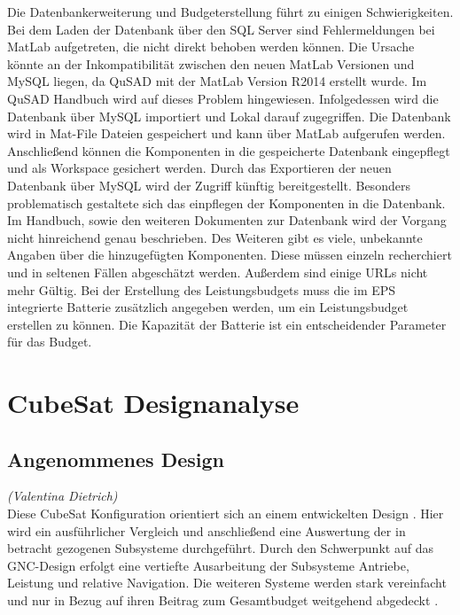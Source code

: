 			Die Datenbankerweiterung und Budgeterstellung führt zu einigen Schwierigkeiten. Bei dem Laden der Datenbank über den SQL Server sind Fehlermeldungen bei MatLab aufgetreten, die nicht direkt behoben werden können. Die Ursache könnte an der Inkompatibilität zwischen den neuen MatLab Versionen und MySQL liegen, da QuSAD mit der MatLab Version R2014 erstellt wurde. Im QuSAD Handbuch wird auf dieses Problem hingewiesen. Infolgedessen wird die Datenbank über MySQL importiert und Lokal darauf zugegriffen. Die Datenbank wird in Mat-File Dateien gespeichert und kann über MatLab aufgerufen werden. Anschließend können die Komponenten in die gespeicherte Datenbank eingepflegt und als Workspace gesichert werden. Durch das Exportieren der neuen Datenbank über MySQL wird der Zugriff künftig bereitgestellt. Besonders problematisch gestaltete sich das einpflegen der Komponenten in die Datenbank. Im Handbuch, sowie den weiteren Dokumenten zur Datenbank wird der Vorgang nicht hinreichend genau beschrieben. Des Weiteren gibt es viele, unbekannte Angaben über die hinzugefügten Komponenten. Diese müssen einzeln recherchiert und in seltenen Fällen abgeschätzt werden. Außerdem sind einige URLs nicht mehr Gültig. Bei der Erstellung des Leistungsbudgets muss die im EPS integrierte Batterie zusätzlich angegeben werden, um ein Leistungsbudget erstellen zu können. Die Kapazität der Batterie ist ein entscheidender Parameter für das Budget. 
		
		\section{CubeSat Designanalyse}
				
				\subsection{Angenommenes Design}
				\label{cap:AngenommenesDesign}
				\hfill\emph{(Valentina Dietrich)}\\
				
				Diese CubeSat Konfiguration orientiert sich an einem entwickelten Design \cite{Lettau.}. Hier wird ein ausführlicher Vergleich und anschließend eine Auswertung der in betracht gezogenen Subsysteme durchgeführt. Durch den Schwerpunkt auf das GNC-Design erfolgt eine vertiefte Ausarbeitung der Subsysteme Antriebe, Leistung und relative Navigation. Die weiteren Systeme werden stark vereinfacht und nur in Bezug auf ihren Beitrag zum Gesamtbudget weitgehend abgedeckt \cite{Lettau.}. 
				
